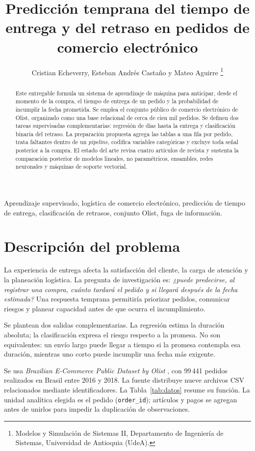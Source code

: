 \documentclass[journal]{IEEEtran}
\title{Predicción temprana del tiempo de entrega y del retraso en pedidos de comercio electrónico}
\author{Cristian Echeverry, Esteban Andrés Castaño y Mateo Aguirre%
\thanks{Modelos y Simulación de Sistemas II, Departamento de Ingeniería de Sistemas, Universidad de Antioquia (UdeA).}}
\begin{document}
\maketitle

\begin{abstract}
Este entregable formula un sistema de aprendizaje de máquina para anticipar, desde el momento de la compra, el tiempo de entrega de un pedido y la probabilidad de incumplir la fecha prometida. Se emplea el conjunto público de comercio electrónico de Olist, organizado como una base relacional de cerca de cien mil pedidos. Se definen dos tareas supervisadas complementarias: regresión de días hasta la entrega y clasificación binaria del retraso. La preparación propuesta agrega las tablas a una fila por pedido, trata faltantes dentro de un \emph{pipeline}, codifica variables categóricas y excluye toda señal posterior a la compra. El estado del arte revisa cuatro artículos de revista y sustenta la comparación posterior de modelos lineales, no paramétricos, ensambles, redes neuronales y máquinas de soporte vectorial.
\end{abstract}

\begin{IEEEkeywords}
Aprendizaje supervisado, logística de comercio electrónico, predicción de tiempo de entrega, clasificación de retrasos, conjunto Olist, fuga de información.
\end{IEEEkeywords}

\section{Descripción del problema}
La experiencia de entrega afecta la satisfacción del cliente, la carga de atención y la planeación logística. La pregunta de investigación es: \emph{¿puede predecirse, al registrar una compra, cuánto tardará el pedido y si llegará después de la fecha estimada?} Una respuesta temprana permitiría priorizar pedidos, comunicar riesgos y planear capacidad antes de que ocurra el incumplimiento.

Se plantean dos salidas complementarias. La regresión estima la duración absoluta; la clasificación expresa el riesgo respecto a la promesa. No son equivalentes: un envío largo puede llegar a tiempo si la promesa contempla esa duración, mientras uno corto puede incumplir una fecha más exigente.

Se usa \emph{Brazilian E-Commerce Public Dataset by Olist} \cite{olist2018dataset}, con 99\,441 pedidos realizados en Brasil entre 2016 y 2018. La fuente distribuye nueve archivos CSV relacionados mediante identificadores. La Tabla~\ref{tab:datos} resume su función. La unidad analítica elegida es el pedido (\texttt{order\_id}); artículos y pagos se agregan antes de unirlos para impedir la duplicación de observaciones.
\end{document}
